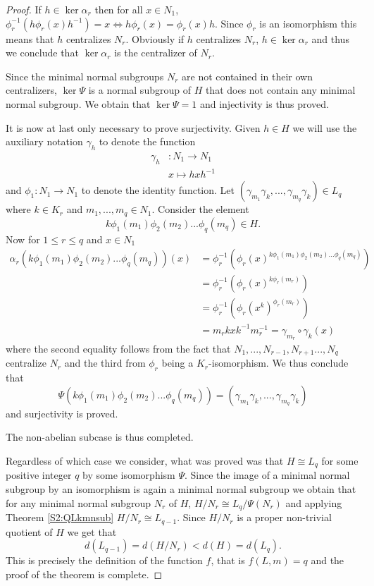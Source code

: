 \begin{proof}
If $h \in \ker \alpha_r$ then for all $x \in N_1$, $\phi_r^{-1}(h\phi_r(x)h^{-1}) = x \iff h\phi_r(x) = \phi_r(x)h$. Since $\phi_r$ is an isomorphism this means that $h$ centralizes $N_r$. Obviously if $h$ centralizes $N_r$, $h \in \ker \alpha_r$ and thus we conclude that $\ker \alpha_r$ is the centralizer of $N_r$. 

Since the minimal normal subgroups $N_r$ are not contained in their own centralizers, $\ker \Psi$ is a normal subgroup of $H$ that does not contain any minimal normal subgroup. 
We obtain that $\ker \Psi = 1$  and injectivity is thus proved.

It is now at last only necessary to prove surjectivity. Given $h \in H$ we will use the auxiliary notation $\gamma_h$ to denote the function
\begin{align*}
    \gamma_h &\colon N_1 \rightarrow N_1 \\
             &x \mapsto hxh^{-1}
\end{align*}
and $\phi_1 \colon N_1 \rightarrow N_1$ to denote the identity function.
Let $(\gamma_{m_1}\gamma_k,...,\gamma_{m_q}\gamma_k) \in L_q$ where $k \in K_r$ and $m_1,...,m_q \in N_1$. 
Consider the element $$k\phi_1(m_1)\phi_2(m_2)...\phi_q(m_q) \in H.$$ 
Now for $1 \le r \le q$ and $x \in N_1$
\begin{align*}
    \alpha_r(k\phi_1(m_1)\phi_2(m_2)...\phi_q(m_q))(x) &= \phi_r^{-1}(\phi_r(x)^{k\phi_1(m_1)\phi_2(m_2)...\phi_q(m_q)}) \\
    &= \phi_r^{-1}(\phi_r(x)^{k\phi_r(m_r)}) \\
    &= \phi_r^{-1}(\phi_r(x^k)^{\phi_r(m_r)}) \\
    &= m_rkxk^{-1}m_r^{-1} = \gamma_{m_r} \circ \gamma_{k}(x)
\end{align*}
where the second equality follows from the fact that $N_1,...,N_{r-1},N_{r+1}...,N_q$ centralize $N_r$ and the third from $\phi_r$ being a $K_r$-isomorphism. We thus conclude that
$$
\Psi(k\phi_1(m_1)\phi_2(m_2)...\phi_q(m_q)) = (\gamma_{m_1}\gamma_k,...,\gamma_{m_q}\gamma_k)
$$
and surjectivity is proved.

The non-abelian subcase is thus completed.

\vspace{2em}

Regardless of which case we consider, what was proved was that $H \cong L_q$ for some positive integer $q$ by some isomorphism $\Psi$. Since the image of a minimal normal subgroup by an isomorphism is again a minimal normal subgroup we obtain that for any minimal normal subgroup $N_r$ of $H$, $H/N_r \cong L_{q}/\Psi(N_r)$ and applying Theorem \ref{S2:QLkmnsub} $H/N_r \cong L_{q-1}$. Since $H/N_r$ is a proper non-trivial quotient of $H$ we get that
$$
d(L_{q-1}) = d(H/N_r) < d(H) = d(L_q).
$$
This is precisely the definition of the function $f$, that is $f(L,m) = q$ and the proof of the theorem is complete. 

\end{proof}